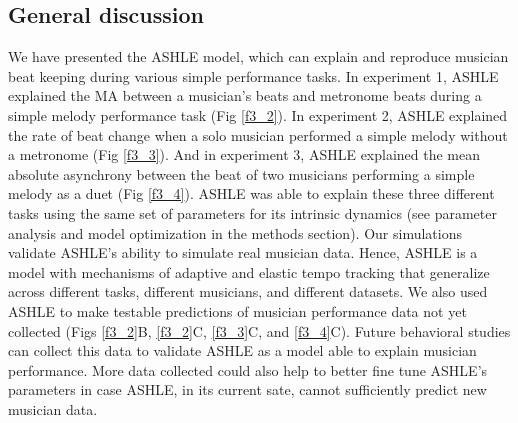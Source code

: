 \documentclass{report}
\begin{document}
\subsection{General discussion}
We have presented the ASHLE model, which can explain and reproduce musician beat keeping during various simple performance tasks. In experiment 1, ASHLE explained the MA between a musician's beats and metronome beats during a simple melody performance task (Fig \ref{f3_2}). In experiment 2, ASHLE explained the rate of beat change when a solo musician performed a simple melody without a metronome (Fig \ref{f3_3}). And in experiment 3, ASHLE explained the mean absolute asynchrony between the beat of two musicians performing a simple melody as a duet (Fig \ref{f3_4}). ASHLE was able to explain these three different tasks using the same set of parameters for its intrinsic dynamics (see parameter analysis and model optimization in the methods section). Our simulations validate ASHLE's ability to simulate real musician data. Hence, ASHLE is a model with mechanisms of adaptive and elastic tempo tracking that generalize across different tasks, different musicians, and different datasets. We also used ASHLE to make testable predictions of musician performance data not yet collected (Figs \ref{f3_2}B, \ref{f3_2}C, \ref{f3_3}C, and \ref{f3_4}C). Future behavioral studies can collect this data to validate ASHLE as a model able to explain musician performance. More data collected could also help to better fine tune ASHLE's parameters in case ASHLE, in its current sate, cannot sufficiently predict new musician data.
\end{document}
